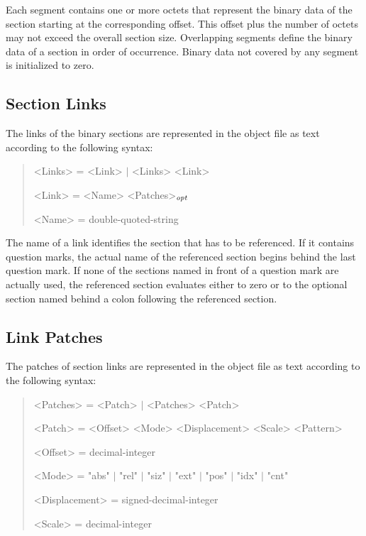 Each segment contains one or more octets that represent the binary data of the section starting at the corresponding offset.
This offset plus the number of octets may not exceed the overall section size.
Overlapping segments define the binary data of a section in order of occurrence.
Binary data not covered by any segment is initialized to zero.

\subsection{Section Links}

The links of the binary sections are represented in the object file as text according to the following syntax:

\begin{quote}\begin{grammar}
<Links> = <Link> $\mid$ <Links> <Link> \par
<Link> = <Name> <Patches>$_\mathit{opt}$ \par
<Name> = double-quoted-string \par
\end{grammar}\end{quote}

The name of a link identifies the section that has to be referenced.
If it contains question marks, the actual name of the referenced section begins behind the last question mark.
If none of the sections named in front of a question mark are actually used, the referenced section evaluates either to zero or to the optional section named behind a colon following the referenced section.

\subsection{Link Patches}

The patches of section links are represented in the object file as text according to the following syntax:

\begin{quote}\begin{grammar}
<Patches> = <Patch> $\mid$ <Patches> <Patch> \par
<Patch> = <Offset> <Mode> <Displacement> <Scale> <Pattern> \par
<Offset> = decimal-integer \par
<Mode> = "abs" $\mid$ "rel" $\mid$ "siz" $\mid$ "ext" $\mid$ "pos" $\mid$ "idx" $\mid$ "cnt" \par
<Displacement> = signed-decimal-integer \par
<Scale> = decimal-integer \par
\end{grammar}\end{quote}

